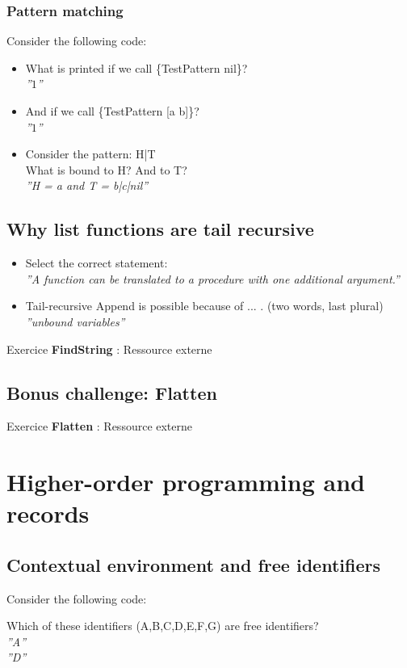 \documentclass[fr,license=none]{../../../eplsummary}
\begin{document}
			\subsubsection*{Pattern matching}
				Consider the following code:
				
				\begin{itemize}
					\item What is printed if we call \{TestPattern nil\}?\\
						\textit{''$1$''}
					\item And if we call \{TestPattern [a b]\}?\\
						\textit{''$1$''}
					\item Consider the pattern: H|T \\
					What is bound to H? And to T?\\
						\textit{''H = a and T = b|c|nil''}
				\end{itemize}
		\subsection{Why list functions are tail recursive}
			\begin{itemize}
				\item Select the correct statement:\\
					\textit{''A function can be translated to a procedure with one additional argument.''}
				\item Tail-recursive Append is possible because of ... . (two words, last plural)\\
					\textit{''unbound variables''}
			\end{itemize}
			Exercice \textbf{FindString} : Ressource externe\\
			
		\subsection{Bonus challenge: Flatten}
			Exercice \textbf{Flatten} : Ressource externe\\
			
	\section{Higher-order programming and records}
		\subsection{Contextual environment and free identifiers}
			Consider the following code:
			
			Which of these identifiers (A,B,C,D,E,F,G) are free identifiers?\\
				\textit{''A''}\\
				\textit{''D''}
\end{document}
